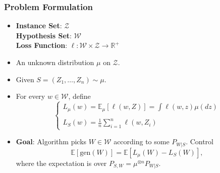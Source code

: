 \documentclass[usenames,dvipsnames, 10pt]{beamer}
\newcommand{\R}{\mathbb{R}}
\newcommand{\E}{\mathbb{E}}
\begin{document}
\begin{frame}
	\frametitle{Problem Formulation}
	
	\begin{itemize}
		\item 
		
		
		\textbf{Instance Set}: $\mathcal{Z}$ \\ \textbf{Hypothesis Set}: $\mathcal{W}$ \\
		\textbf{Loss Function}:
		$\ell: \mathcal{W}\times \mathcal{Z} \to \R^+$
		
		\pause
		\item An unknown distribution  $\mu$ on $\mathcal{Z}$.			
		
		\pause
		\item Given $S = (Z_1, \dots, Z_n)\sim \mu$.
		
		
		\pause
		\item For every $w \in \mathcal{W}$, define
		\begin{equation*}
		\begin{cases}
			L_\mu(w) = \E_\mu[\ell(w, Z)] = \int \ell(w, z) \mu(dz)\\
			\\
			L_S(w) = \frac{1}{n}\sum_{i = 1}^{n} \ell(w, Z_i)
		\end{cases}
		\end{equation*}
	
		\pause
		\item \textbf{Goal}:  Algorithm picks $W \in \mathcal{W}$ according to some $P_{W|S}$. Control
			\begin{equation*}
				\E [\mathrm{gen}(W)] =  \E [L_\mu(W) - L_S(W)],
			\end{equation*}
			where the expectation is over $P_{S, W} = \mu^{\otimes n}  P_{W|S}$.		
	\end{itemize}
	
\end{frame}
\end{document}
